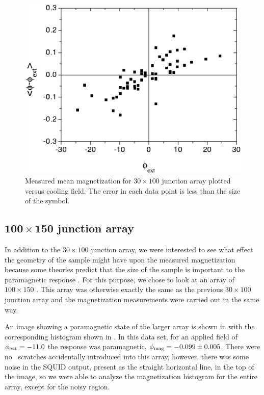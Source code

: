 \begin{figure}[p]
\includegraphics[width=5.7in,keepaspectratio=true]{figs/pme_exp/fig3_8.eps}
\caption[Measured mean magnetization for $30 \times 100$ junction
array plotted versus cooling field.]{Measured mean magnetization
for $30 \times 100$ junction array plotted versus cooling field.
The error in each data point is less than the size of the symbol.}
\label{fig:sm_array_mag_plot}
\end{figure}

\subsection[$100 \times 150$ junction array]
{$\mathbf{100 \times 150}$ junction array}

In addition to the $30 \times 100$ junction array, we were interested
to see 
what effect the geometry of the sample might have upon the measured
magnetization because some theories predict that 
the size of the
sample is important to the paramagnetic response
\cite{geim_nature_396_144_1998,koshelev_prb_53_13559_1995}. 
For this purpose,
we chose to 
look at an array of 
$100 \times 150$ \jjsnoun. This array was otherwise exactly the same as the 
previous $30 \times 100$ junction array and the 
magnetization measurements were
carried out in the same way. 

An 
image showing a paramagnetic state of the larger array is shown
in  with the corresponding
histogram shown in . 
In this data set, for an applied field of $\phi_{\mathrm{ext}} = -11.0$
the response was paramagnetic, $\phi_{\mathrm{mag}} = -0.099 \pm 0.005$.
There were
no \insitu\ scratches accidentally introduced into this array, 
however, there was some noise in the SQUID output, present as the
straight horizontal line, in the top of the image,
so we 
were able to analyze the magnetization histogram for the entire array,
except for the noisy region.  

